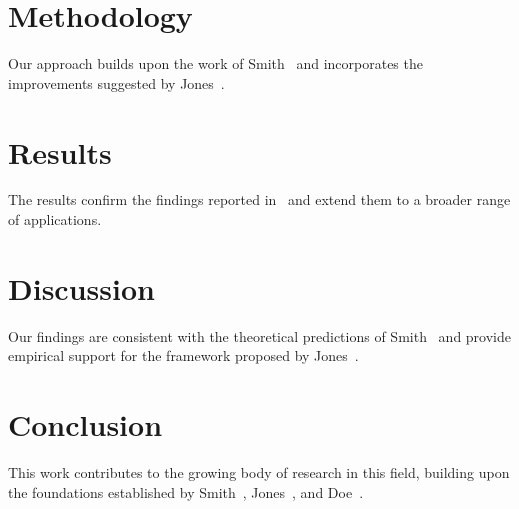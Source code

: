 \documentclass{article}
\begin{document}
\section{Methodology}
Our approach builds upon the work of Smith~\cite{smith2023} and incorporates the improvements suggested by Jones~\cite{jones2022}.

\section{Results}
The results confirm the findings reported in~\cite{doe2023} and extend them to a broader range of applications.

\section{Discussion}
Our findings are consistent with the theoretical predictions of Smith~\cite{smith2023} and provide empirical support for the framework proposed by Jones~\cite{jones2022}.

\section{Conclusion}
This work contributes to the growing body of research in this field, building upon the foundations established by Smith~\cite{smith2023}, Jones~\cite{jones2022}, and Doe~\cite{doe2023}.



\end{document}
